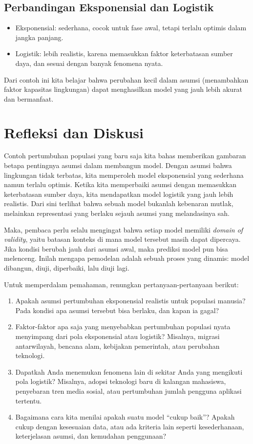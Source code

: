 \documentclass{bukumjh}
\begin{document}
\subsection*{Perbandingan Eksponensial dan Logistik}

\begin{itemize}
    \item Eksponensial: sederhana, cocok untuk fase awal, tetapi terlalu optimis dalam jangka panjang.
    \item Logistik: lebih realistis, karena memasukkan faktor keterbatasan sumber daya, dan sesuai dengan banyak fenomena nyata.
\end{itemize}

Dari contoh ini kita belajar bahwa perubahan kecil dalam asumsi (menambahkan faktor kapasitas lingkungan) dapat menghasilkan model yang jauh lebih akurat dan bermanfaat. 

\section{Refleksi dan Diskusi}

Contoh pertumbuhan populasi yang baru saja kita bahas memberikan gambaran betapa pentingnya asumsi dalam membangun model. Dengan asumsi bahwa lingkungan tidak terbatas, kita memperoleh model eksponensial yang sederhana namun terlalu optimis. Ketika kita memperbaiki asumsi dengan memasukkan keterbatasan sumber daya, kita mendapatkan model logistik yang jauh lebih realistis. Dari sini terlihat bahwa sebuah model bukanlah kebenaran mutlak, melainkan representasi yang berlaku sejauh asumsi yang melandasinya sah.

Maka, pembaca perlu selalu mengingat bahwa setiap model memiliki \textit{domain of validity}, yaitu batasan konteks di mana model tersebut masih dapat dipercaya. Jika kondisi berubah jauh dari asumsi awal, maka prediksi model pun bisa melenceng. Inilah mengapa pemodelan adalah sebuah proses yang dinamis: model dibangun, diuji, diperbaiki, lalu diuji lagi.

Untuk memperdalam pemahaman, renungkan pertanyaan-pertanyaan berikut:

\begin{enumerate}
    \item Apakah asumsi pertumbuhan eksponensial realistis untuk populasi manusia? Pada kondisi apa asumsi tersebut bisa berlaku, dan kapan ia gagal?
    \item Faktor-faktor apa saja yang menyebabkan pertumbuhan populasi nyata menyimpang dari pola eksponensial atau logistik? Misalnya, migrasi antarwilayah, bencana alam, kebijakan pemerintah, atau perubahan teknologi.
    \item Dapatkah Anda menemukan fenomena lain di sekitar Anda yang mengikuti pola logistik? Misalnya, adopsi teknologi baru di kalangan mahasiswa, penyebaran tren media sosial, atau pertumbuhan jumlah pengguna aplikasi tertentu.
    \item Bagaimana cara kita menilai apakah suatu model “cukup baik”? Apakah cukup dengan kesesuaian data, atau ada kriteria lain seperti kesederhanaan, keterjelasan asumsi, dan kemudahan penggunaan?
\end{enumerate}
\end{document}
